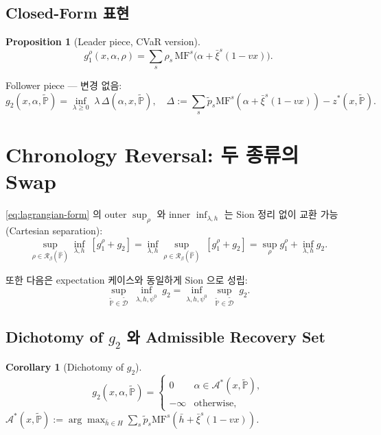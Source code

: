 \documentclass[11pt]{article}
\newcommand{\Phat}{\hat{\mathbb{P}}}
\newcommand{\Ptil}{\tilde{\mathbb{P}}}
\newcommand{\Dtil}{\tilde{\mathcal{D}}}
\newcommand{\tilp}{\tilde{p}}
\newcommand{\barxi}{\bar{\xi}}
\newcommand{\barh}{\bar{h}}
\newcommand{\MF}{\mathrm{MF}}
\newcommand{\Rb}{\mathcal{R}_\beta}
\theoremstyle{plain}
\newtheorem{proposition}{Proposition}
\newtheorem{corollary}{Corollary}
\theoremstyle{remark}
\begin{document}
\subsection{Closed-Form 표현}

\begin{proposition}[Leader piece, CVaR version]\label{prop:g1cvar}
\[
g_1^\rho(x, \alpha, \rho) = \sum_s \rho_s\, \MF^s\!\big(\alpha + \barxi^s(1-vx)\big).
\]
\end{proposition}

Follower piece --- 변경 없음:
\[
g_2(x, \alpha, \Ptil) = \inf_{\lambda \geq 0}\; \lambda\,\Delta(\alpha, x, \Ptil),\quad
\Delta := \sum_s \tilp_s \MF^s(\alpha + \barxi^s(1-vx)) - z^*(x, \Ptil).
\]


\section{Chronology Reversal: 두 종류의 Swap}
\label{sec:chronology}

\eqref{eq:lagrangian-form} 의 outer $\sup_\rho$ 와 inner $\inf_{\lambda, h}$ 는 Sion 정리 없이 교환 가능 (Cartesian separation):
\begin{equation}\label{eq:swap-identity}
\sup_{\rho \in \Rb(\Phat)} \inf_{\lambda, h}\; [g_1^\rho + g_2]
= \inf_{\lambda, h} \sup_{\rho \in \Rb(\Phat)}\; [g_1^\rho + g_2]
= \sup_\rho g_1^\rho + \inf_{\lambda, h} g_2.
\end{equation}

또한 다음은 expectation 케이스와 동일하게 Sion 으로 성립:
\begin{equation}\label{eq:sion-needed}
\sup_{\Ptil \in \Dtil}\; \inf_{\lambda, h, \psi^0}\; g_2 = \inf_{\lambda, h, \psi^0}\; \sup_{\Ptil \in \Dtil}\; g_2.
\end{equation}

\subsection{Dichotomy of $g_2$ 와 Admissible Recovery Set}

\begin{corollary}[Dichotomy of $g_2$]\label{cor:dichotomy}
\[
g_2(x, \alpha, \Ptil) = \begin{cases} 0 & \alpha \in \mathcal{A}^*(x, \Ptil),\\ -\infty & \text{otherwise,}\end{cases}
\]
$\mathcal{A}^*(x, \Ptil) := \arg\max_{\barh \in H} \sum_s \tilp_s \MF^s(\barh + \barxi^s(1-vx))$.
\end{corollary}
\end{document}
